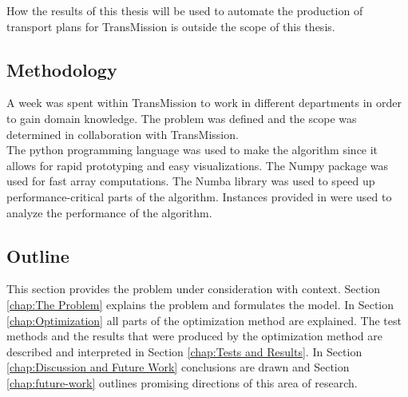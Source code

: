  How the results of this thesis will be used to automate the production of transport plans for TransMission is outside the scope of this thesis.




\subsection{Methodology}
A week was spent within TransMission to work in different departments in order to gain  domain knowledge.
The problem was defined and the scope was determined in collaboration with TransMission.\\

The python programming language \cite{vanpython} was used to make the algorithm since it allows for rapid prototyping and easy visualizations.
The Numpy package \cite{numpy} was used for fast array computations.
 The  Numba library \cite{analytics2014numba} was used to speed up performance-critical parts of the algorithm.
 Instances provided in \cite{drexl2007some,drexl2011branch} were used to analyze the performance of the algorithm.

\subsection{Outline}
This section provides the problem under consideration with context.
Section \ref{chap:The Problem} explains the problem and formulates the model.
In Section \ref{chap:Optimization} all parts of the optimization method are explained.
The test methods and the results that were produced by the optimization method are described and interpreted in Section \ref{chap:Tests and Results}.
In Section \ref{chap:Discussion and Future Work} conclusions are drawn and  Section \ref{chap:future-work} outlines promising  directions of this area of research.
